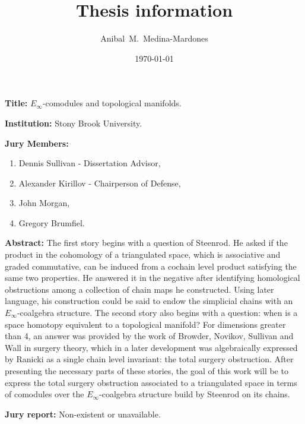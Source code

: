 \documentclass[9pt]{amsart}
\title{Thesis information}
\author[A.~Medina-Mardones]{Anibal~M.~Medina-Mardones}
\date{\today}
\begin{document}
	\vspace*{-1cm}
	\maketitle
	\thispagestyle{empty}
	\noindent\textbf{Title:} $E_\infty$-comodules and topological manifolds.

	\noindent\textbf{Institution:} Stony Brook University.

	\noindent\textbf{Jury Members:}
	\begin{enumerate}
		\item Dennis Sullivan - Dissertation Advisor,
		\item Alexander Kirillov - Chairperson of Defense,
		\item John Morgan,
		\item Gregory Brumfiel.
	\end{enumerate}

	\noindent\textbf{Abstract:}
	The first story begins with a question of Steenrod.
	He asked if the product	in the cohomology of a triangulated space, which is associative and graded commutative, can be induced from a cochain level product satisfying the same two properties.
	He answered it in the negative after identifying homological obstructions among a collection of chain maps he constructed.
	Using later language, his construction could be said to endow the simplicial chains with an $E_\infty$-coalgebra structure.
	The second story also begins with a question: when is a space homotopy equivalent to a topological manifold? For dimensions greater than 4, an answer was provided by the work of Browder, Novikov, Sullivan and Wall in
	surgery theory, which in a later development was algebraically expressed by Ranicki as a single chain level invariant: the total surgery obstruction.
	After presenting the necessary parts of these stories, the goal of this work will be to express the total surgery obstruction associated to a triangulated space in terms of comodules over the $E_\infty$-coalgebra structure build by Steenrod on its chains.

	\noindent\textbf{Jury report:} Non-existent or unavailable.
\end{document}

